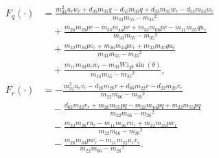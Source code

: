 \begin{subequations}
\begin{align}
        F_q(\cdot) &= \frac{m_{33}^2u_rw_r+d_{35}m_{35}q-d_{55}m_{33}q+d_{33}m_{35}w_r-d_{53}m_{33}w_r}{m_{33}m_{55}-{m_{35}}^2} \\
        &\quad + \frac{m_{26}m_{35}pr-m_{33}m_{44}pr+m_{33}m_{66}pr-m_{11}m_{35}qu_r}{m_{33}m_{55}-{m_{35}}^2} \nonumber \\
        &\quad + \frac{m_{22}m_{35}pv_r+m_{26}m_{33}pv_r+m_{33}m_{35}qu_r}{m_{33}m_{55}-{m_{35}}^2} \nonumber \\
        &\quad + \frac{m_{11}m_{33}u_rw_r-m_{33} W z_{gb} \sin(\theta)}{m_{33}m_{55}-{m_{35}}^2}, \nonumber \\
        F_r(\cdot) &= -\frac{m_{22}^2u_rv_r-d_{26}m_{26}r+d_{66}m_{22}r-d_{22}m_{26}v_r}{m_{22}m_{66}-{m_{26}}^2} \\
        &\quad - \frac{d_{62}m_{22}v_r+m_{26}m_{35}pq-m_{22}m_{44}pq+m_{22}m_{55}pq}{m_{22}m_{66}-{m_{26}}^2} \nonumber \\
        &\quad - \frac{m_{22}m_{26}ru_r-m_{11}m_{26}ru_r+m_{22}m_{35}pw_r}{m_{22}m_{66}-{m_{26}}^2} \nonumber \\
        &\quad - \frac{m_{26}m_{33}pw_r-m_{11}m_{22}u_rv_r}{m_{22}m_{66}-{m_{26}}^2}. \nonumber
    \end{align}
\end{subequations}

